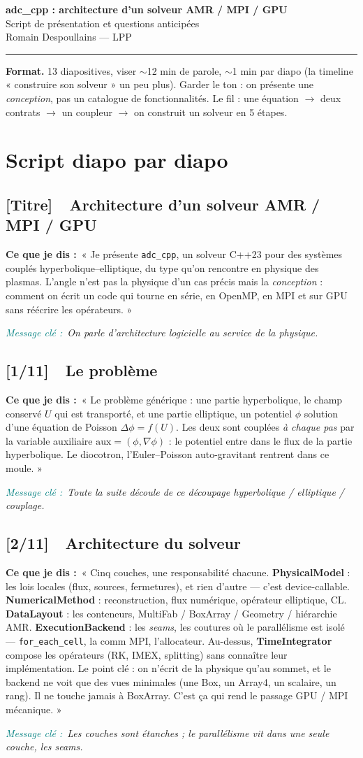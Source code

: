 \documentclass[11pt]{article}
\newcommand{\slidetag}[2]{\subsection{\textcolor{lpp}{[#1]}\ \ #2}}
\newcommand{\dit}[1]{\par\smallskip\textbf{Ce que je dis :}\ #1}
\newcommand{\msg}[1]{\par\textit{\textcolor{teal}{Message clé :}}\ \textit{#1}}
\newcommand{\code}[1]{\texttt{\small #1}}
\begin{document}
\begin{center}
  {\LARGE\bfseries\color{lpp} adc\_cpp : architecture d'un solveur AMR / MPI / GPU}\\[2pt]
  {\large Script de présentation et questions anticipées}\\[2pt]
  {\small Romain Despoullains — LPP}
\end{center}
\vspace{0.4em}
\hrule
\vspace{0.8em}

\noindent\textbf{Format.} 13 diapositives, viser $\sim$12 min de parole, $\sim$1 min par diapo
(la timeline « construire son solveur » un peu plus). Garder le ton : on présente une
\emph{conception}, pas un catalogue de fonctionnalités. Le fil : une équation $\rightarrow$
deux contrats $\rightarrow$ un coupleur $\rightarrow$ on construit un solveur en 5 étapes.

\section{Script diapo par diapo}

\slidetag{Titre}{Architecture d'un solveur AMR / MPI / GPU}
\dit{« Je présente \code{adc\_cpp}, un solveur C++23 pour des systèmes couplés
hyperbolique–elliptique, du type qu'on rencontre en physique des plasmas. L'angle
n'est pas la physique d'un cas précis mais la \emph{conception} : comment on écrit un
code qui tourne en série, en OpenMP, en MPI et sur GPU sans réécrire les opérateurs. »}
\msg{On parle d'architecture logicielle au service de la physique.}

\slidetag{1/11}{Le problème}
\dit{« Le problème générique : une partie hyperbolique, le champ conservé $U$ qui est
transporté, et une partie elliptique, un potentiel $\phi$ solution d'une équation de
Poisson $\Delta\phi = f(U)$. Les deux sont couplées \emph{à chaque pas} par la variable
auxiliaire $\mathrm{aux} = (\phi, \nabla\phi)$ : le potentiel entre dans le flux de la
partie hyperbolique. Le diocotron, l'Euler–Poisson auto-gravitant rentrent dans ce
moule. »}
\msg{Toute la suite découle de ce découpage hyperbolique / elliptique / couplage.}

\slidetag{2/11}{Architecture du solveur}
\dit{« Cinq couches, une responsabilité chacune. \textbf{PhysicalModel} : les lois
locales (flux, sources, fermetures), et rien d'autre — c'est device-callable.
\textbf{NumericalMethod} : reconstruction, flux numérique, opérateur elliptique, CL.
\textbf{DataLayout} : les conteneurs, MultiFab / BoxArray / Geometry / hiérarchie AMR.
\textbf{ExecutionBackend} : les \emph{seams}, les coutures où le parallélisme est isolé —
\code{for\_each\_cell}, la comm MPI, l'allocateur. Au-dessus, \textbf{TimeIntegrator}
compose les opérateurs (RK, IMEX, splitting) sans connaître leur implémentation.
Le point clé : on n'écrit de la physique qu'au sommet, et le backend ne voit que des
vues minimales (une Box, un Array4, un scalaire, un rang). Il ne touche jamais à
BoxArray. C'est ça qui rend le passage GPU / MPI mécanique. »}
\msg{Les couches sont étanches ; le parallélisme vit dans une seule couche, les seams.}
\end{document}
